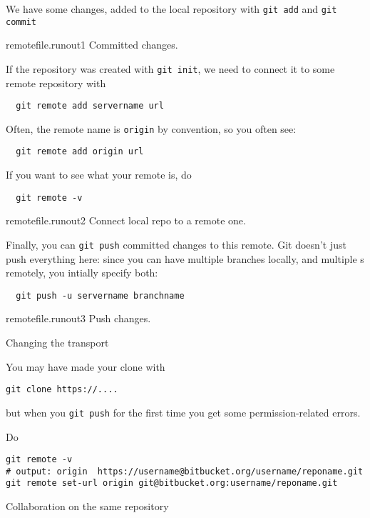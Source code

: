 We have some changes, added to the local repository
with \lstinline{git add} and \lstinline{git commit}

\begin{gitstep}{remotefile.runout1}
  Committed changes.
\end{gitstep}

If the repository was created with \lstinline{git init},
we need to connect it to some remote repository with
\begin{lstlisting}
  git remote add servername url
\end{lstlisting}
Often, the remote name is \lstinline{origin} by convention,
so you often see:
\begin{lstlisting}
  git remote add origin url
\end{lstlisting}
If you want to see what your remote is, do
\begin{lstlisting}
  git remote -v
\end{lstlisting}


\begin{gitstep}{remotefile.runout2}
  Connect local repo to a remote one.
\end{gitstep}

Finally, you can \lstinline{git push} committed changes to this remote.
Git doesn't just push everything here: since you can have multiple branches locally,
and multiple s remotely, you intially specify both:
\begin{lstlisting}
  git push -u servername branchname
\end{lstlisting}

\begin{gitstep}{remotefile.runout3}
  Push changes.
\end{gitstep}

\newpage
{} {Changing the transport}

You may have made your clone with
\begin{verbatim}
git clone https://....
\end{verbatim}
but when you \lstinline{git push} for the first time
you get some permission-related errors.

Do
\begin{verbatim}
git remote -v
# output: origin  https://username@bitbucket.org/username/reponame.git
git remote set-url origin git@bitbucket.org:username/reponame.git
\end{verbatim}

\newpage
{} {Collaboration on the same repository}

